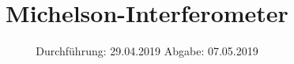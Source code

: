 

\subject{V401}
\title{Michelson-Interferometer}
\date{%
Durchführung: {29.04.2019}
\hspace{3em}
Abgabe: {07.05.2019}
}



\maketitle
\thispagestyle{empty}
\tableofcontents
\newpage





\printbibliography{}

